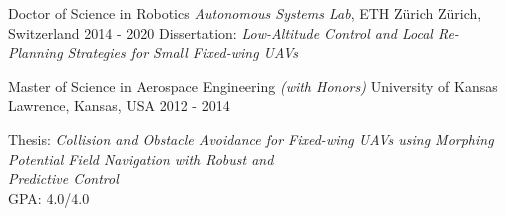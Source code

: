 

\begin{cventries}

  \cveduentry
    {Doctor of Science in Robotics} %
    {\textit{Autonomous Systems Lab}, ETH Z\"{u}rich} %
    {Z\"{u}rich, Switzerland} %
    {2014 - 2020} %
    {Dissertation: \textit{Low-Altitude Control and Local Re-Planning Strategies for Small Fixed-wing UAVs}}
    
  \cveduentry
    {Master of Science in Aerospace Engineering \textit{(with Honors)}} %
    {University of Kansas} %
    {Lawrence, Kansas, USA} %
    {2012 - 2014} %
    {\parbox{\linewidth}{\vspace*{0.1cm}
		Thesis: \textit{Collision and Obstacle Avoidance for Fixed-wing UAVs using Morphing Potential Field Navigation with Robust and} \\	
		\hspace*{0.9cm} \textit{Predictive Control} \\
        GPA: 4.0/4.0
        }
    }
    

\end{cventries}
